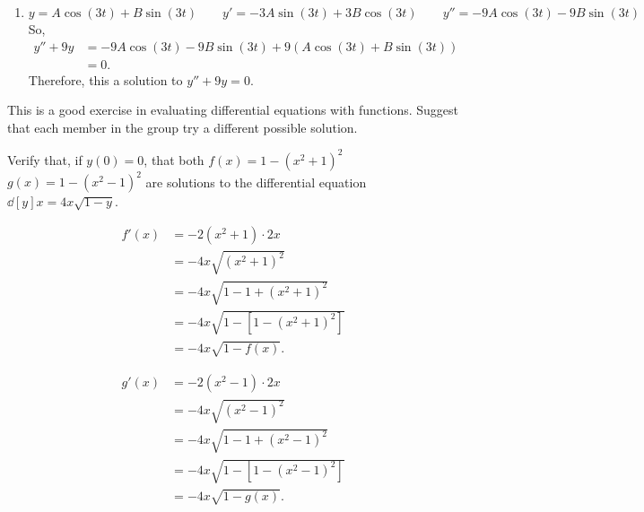 \documentclass[]{ximera}
\begin{document}
\begin{problem}
\begin{freeResponse}
\begin{enumerate}
	
	
	\item  \[ y = A\cos(3t)+B\sin(3t) 	\qquad	y'=-3A\sin(3t)+3B\cos(3t) 	\qquad	y''=-9A\cos(3t)-9B\sin(3t) \]  
	So,
		\begin{align*}
		y''+9y 
		&= -9A\cos(3t)-9B\sin(3t) +9(A\cos(3t)+B\sin(3t))  \\
		&= 0.
		\end{align*}
	Therefore, this  a solution to $y''+9y=0$.
	
	\end{enumerate}
	\end{freeResponse}
	
\end{problem}

\begin{instructorNotes}
This is a good exercise in evaluating differential equations with functions.  
Suggest that each member in the group try a different possible solution.
\end{instructorNotes}







\begin{problem}
Verify that, if $y(0)=0$, that both $f(x)=1-(x^2+1)^2$  $g(x) = 1 - (x^2-1)^2$ are solutions to the differential equation $\dd[y]{x} = 4x\sqrt{1-y}$.
	\begin{freeResponse}
		\begin{align*}
		f'(x) &= -2(x^2+1) \cdot 2x  \\
		&= -4x \sqrt{(x^2+1)^2}  \\
		&= -4x \sqrt{1-1+(x^2+1)^2}  \\
		&= -4x \sqrt{1 - \left[1-(x^2+1)^2 \right]}  \\
		&= -4x \sqrt{1-f(x)}.
		\end{align*}
		
		\vskip 5pt
		
		\begin{align*}
		g'(x) &= -2(x^2-1) \cdot 2x  \\
		&= -4x \sqrt{(x^2-1)^2}  \\
		&= -4x \sqrt{1-1+(x^2-1)^2}  \\
		&= -4x \sqrt{1 - \left[1-(x^2-1)^2 \right]}  \\
		&= -4x \sqrt{1-g(x)}.
		\end{align*}
	\end{freeResponse}
		
\end{problem}
\end{document}
